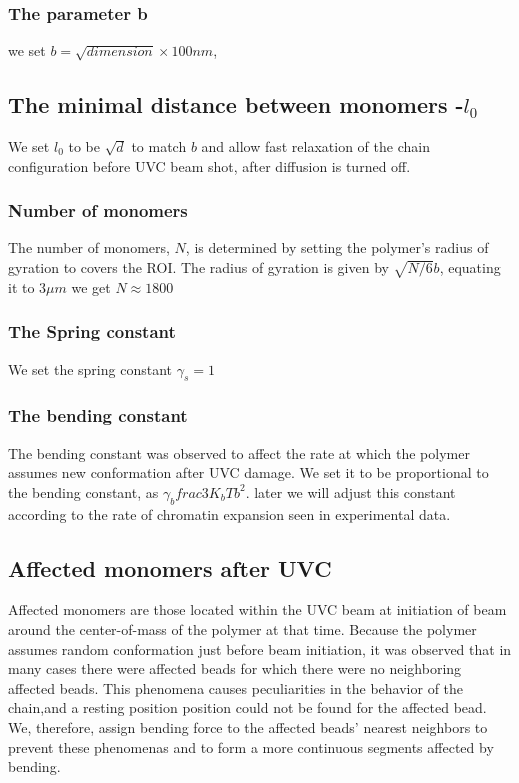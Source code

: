 \documentclass[12pt]{report}
\begin{document}
    \subsubsection{The parameter b} 
      we set $b=\sqrt{dimension} \times 100 nm$, 
    \subsection{The minimal distance between monomers -$l_0$}
     We set $l_0$ to be $\sqrt{d}$ to match $b$ and allow fast relaxation of the chain configuration before UVC beam shot, after diffusion is turned off. 
    \subsubsection{Number of monomers}
      The number of monomers, $N$, is determined by setting the polymer's radius of gyration to covers the ROI. The radius of gyration is given by $\sqrt{N/6}b$, equating it to $3\mu m$ we get $N\approx 1800$                      
     \subsubsection{The Spring constant}
       We set the spring constant $\gamma_s =1$
     \subsubsection{The bending constant}       
       The bending constant was observed to affect the rate at which the polymer assumes new conformation after UVC damage.
       We set it to be proportional to the bending constant, as $\gamma_b frac{3K_bT}{b^2}$. later we will adjust this constant according to the rate of chromatin expansion seen in experimental data. 
       
     \subsection{Affected monomers after UVC}\label{subsection_affectedMonomersAfterUVC}
      Affected monomers are those located within the UVC beam at initiation of beam around the center-of-mass of the polymer at that time. Because the polymer assumes random conformation just before beam initiation, it was observed that in many cases there were affected beads for which there were no neighboring affected beads. This phenomena causes peculiarities in the behavior of the chain,and a resting position position could not be found for the affected bead. We, therefore, assign bending force to the affected beads' nearest neighbors to prevent these phenomenas and to form a more continuous segments affected by bending. 
             		
\end{document}
